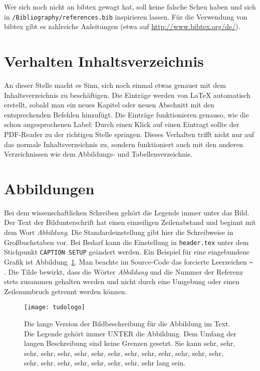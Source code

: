 Wer sich noch nicht an bibtex gewagt hat, soll keine falsche Scheu haben und sich in \texttt{/Bibliography/references.bib} inspirieren lassen. Für die Verwendung von bibtex gibt es zahlreiche Anleitungen (etwa auf \url{http://www.bibtex.org/de/}).

\section{Verhalten Inhaltsverzeichnis}

An dieser Stelle macht es Sinn, sich noch einmal etwas genauer mit dem Inhaltsverzeichnis zu beschäftigen. Die Einträge werden von \LaTeX{} automatisch erstellt, sobald man ein neues Kapitel oder neuen Abschnitt mit den entsprechenden Befehlen hinzufügt. Die Einträge funktionieren genauso, wie die schon angesprochenen Label: Durch einen Klick auf einen Eintragt sollte der PDF-Reader zu der richtigen Stelle springen. Dieses Verhalten trifft nicht nur auf das normale Inhaltsverzeichnis zu, sondern funktioniert auch mit den anderen Verzeichnissen wie dem Abbildungs- und Tabellenverzeichnis.

\section{Abbildungen}

Bei dem wissenschaftlichen Schreiben gehört die Legende immer unter das Bild. Der Text der Bildunterschrift hat einen einzeiligen Zeilenabstand und beginnt mit dem Wort \textit{Abbildung}. Die Standardeinstellung gibt hier die Schreibweise in Großbuchstaben vor. Bei Bedarf kann die Einstellung in \texttt{header.tex} unter dem Stichpunkt \texttt{CAPTION SETUP} geändert werden. Ein Beispiel für eine eingebundene Grafik ist Abbildung~\ref{fig:tudo}. Man beachte im Source-Code das forcierte Leerzeichen { \verb "~" }. Die Tilde bewirkt, dass die Wörter \textit{Abbildung} und die Nummer der Referenz stets zusammen gehalten werden und nicht durch eine Umgebung oder einen Zeilenumbruch getrennt werden können.

\begin{figure}[tbp]
\begin{center}
\texttt{[image: tudologo]}
\end{center}
\caption[Kurze Beschreibung für das Abbildungsverzeichnis]{Die lange Version der Bildbeschreibung für die Abbildung im Text. Die Legende gehört immer UNTER die Abbildung. Dem Umfang der langen Beschreibung sind keine Grenzen gesetzt. Sie kann sehr, sehr, sehr, sehr, sehr, sehr, sehr, sehr, sehr, sehr, sehr, sehr, sehr, sehr, sehr, sehr, sehr, sehr, sehr, sehr, sehr, sehr lang sein.}
\label{fig:tudo}
\end{figure}

